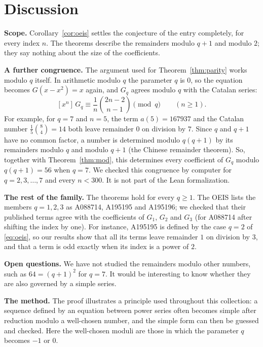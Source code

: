 \documentclass[11pt,a4paper]{article}
\theoremstyle{definition}
\theoremstyle{remark}
\newcommand{\coeff}[2]{[x^{#1}]\,#2}
\newcommand{\para}[1]{\par\medskip\noindent\textbf{#1}\enspace}
\begin{document}
\section{Discussion}\label{sec:discussion}

\para{Scope.} Corollary~\ref{cor:oeis} settles the conjecture of the entry completely,
for every index $n$. The theorems describe the remainders modulo $q+1$ and modulo $2$; they say nothing about the size
of the coefficients.

\para{A further congruence.} The argument used for Theorem~\ref{thm:parity} works modulo $q$ itself. In arithmetic
modulo $q$ the parameter $q$ is $0$, so the equation becomes $G(x-x^2)=x$ again, and $G_q$ agrees modulo $q$ with the
Catalan series:
\[
\coeff{n}{G_q}\equiv\frac{1}{n}\binom{2n-2}{n-1}\pmod q\qquad(n\ge1).
\]
For example, for $q=7$ and $n=5$, the term $a(5)=167937$ and the Catalan number $\frac15\binom84=14$ both leave remainder $0$ on division by $7$. Since $q$ and $q+1$ have no common factor, a number is determined modulo $q(q+1)$ by its
remainders modulo $q$ and modulo $q+1$ (the Chinese remainder theorem). So, together with Theorem~\ref{thm:mod}, this
determines every coefficient of $G_q$ modulo $q(q+1)=56$ when $q=7$. We checked
this congruence by computer for $q=2,3,\dots,7$ and every $n<300$. It is not part of the Lean formalization.

\para{The rest of the family.} The theorems hold for every $q\ge1$. The OEIS lists the members $q=1,2,3$ as A088714,
A195195 and A195196; we checked that their published terms agree with the coefficients of $G_1$, $G_2$ and $G_3$ (for
A088714 after shifting the index by one). For instance, A195195 is defined by the case $q=2$ of
\eqref{eq:oeis}, so our results show that all its terms leave remainder $1$ on division by $3$, and that a term is odd
exactly when its index is a power of $2$.

\para{Open questions.} We have not studied the remainders modulo other numbers, such as $64=(q+1)^2$
for $q=7$. It would be interesting to know whether they are also governed by a simple series.

\para{The method.} The proof illustrates a principle used throughout this collection: a sequence defined by an
equation between power series often becomes simple after reduction modulo a well-chosen number, and the simple form can
then be guessed and checked. Here the well-chosen moduli are those in which the parameter $q$ becomes $-1$ or $0$.
\end{document}
